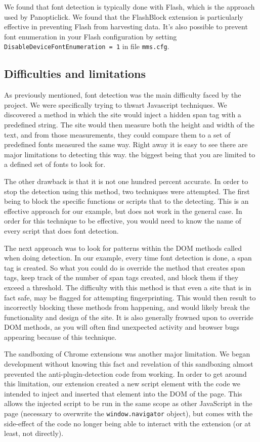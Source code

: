 \documentclass[12pt,a4paper]{article}
\begin{document}
We found that font detection is typically done with Flash, which is the approach used by Panopticlick. We found that the FlashBlock extension\cite{flashblock} is particularly effective in preventing Flash from harvesting data. It's also possible to prevent font enumeration in your Flash configuration by setting \texttt{DisableDeviceFontEnumeration = 1} in file \texttt{mms.cfg}.

\subsection{Difficulties and limitations}
As previously mentioned, font detection was the main difficulty faced by the project. We were specifically trying to thwart Javascript techniques. We discovered a method\cite{fontdetection} in which the site would inject a hidden span tag with a predefined string. The site would then measure both the height and width of the text, and from those measurements, they could compare them to a set of predefined fonts measured the same way. Right away it is easy to see there are major limitations to detecting this way. the biggest being that you are limited to a defined set of fonts to look for.

The other drawback is that it is not one hundred percent accurate. In order to stop the detection using this method, two techniques were attempted. The first being to block the specific functions or scripts that to the detecting. This is an effective approach for our example, but does not work in the general case. In order for this technique to be effective, you would need to know the name of every script that does font detection.

The next approach was to look for patterns within the DOM methods called when doing detection. In our example, every time font detection is done, a span tag is created. So what you could do is override the method that creates span tags, keep track of the number of span tags created, and block them if they exceed a threshold. The difficulty with this method is that even a site that is in fact safe, may be flagged for attempting fingerprinting. This would then result to incorrectly blocking these methods from happening, and would likely break the functionality and design of the site. It is also generally frowned upon to override DOM methods, as you will often find unexpected activity and browser bugs appearing because of this technique.    

The sandboxing of Chrome extensions was another major limitation. We began development without knowing this fact and revelation of this sandboxing almost prevented the anti-plugin-detection code from working. In order to get around this limitation, our extension created a new script element with the code we intended to inject and inserted that element into the DOM of the page. This allows the injected script to be run in the same scope as other JavaScript in the page (necessary to overwrite the \texttt{window.navigator} object), but comes with the side-effect of the code no longer being able to interact with the extension (or at least, not directly).
\end{document}
